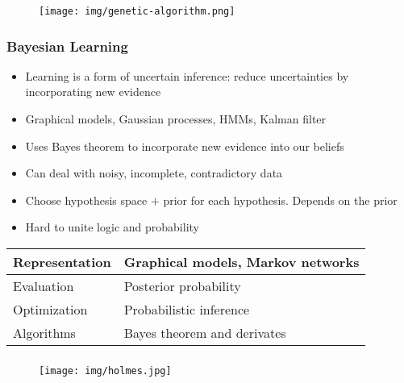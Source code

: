 \documentclass[UTF8,11pt,colorlinks,compress,openany]{beamer}%
\begin{document}
\begin{frame}\frametitle{}
\begin{figure}[H]
\texttt{[image: img/genetic-algorithm.png]}
\end{figure}
\end{frame}

\begin{frame}\frametitle{Bayesian Learning}
\begin{itemize}
	\item Learning is a form of uncertain inference: reduce uncertainties by incorporating new evidence
	\item Graphical models, Gaussian processes, HMMs, Kalman filter
	\item Uses Bayes theorem to incorporate new evidence into our beliefs
	\item Can deal with noisy, incomplete, contradictory data
	\item Choose hypothesis space $+$ prior for each hypothesis. Depends on the prior
	\item Hard to unite logic and probability
\end{itemize}
\begin{table}
\abovetabulinesep=1mm
\belowtabulinesep=1mm
\begin{tabu}{l|l}
\hline
Representation &Graphical models, Markov networks\\
\hline
Evaluation &Posterior probability\\
\hline
Optimization &Probabilistic inference\\
\hline
Algorithms &Bayes theorem and derivates\\
\hline
\end{tabu}
\end{table}
\end{frame}

\begin{frame}\frametitle{}
\begin{figure}[H]
\texttt{[image: img/holmes.jpg]}	
\end{figure}
\end{frame}
\end{document}
